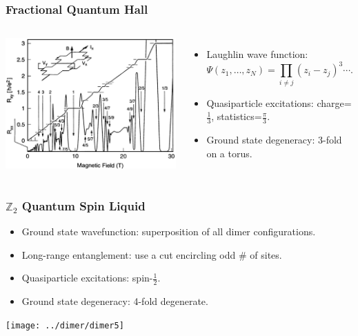 \documentclass[xcolor=table, 10pt, aspectratio=43]{beamer}
\begin{document}
\begin{frame}
\frametitle{Fractional Quantum Hall}
\begin{columns}
  \begin{center}
  \includegraphics[width=\columnwidth]{../resources/fqhe}
  \end{center}
  \begin{itemize}
  \item Laughlin wave function:
  \[\Psi(z_1,\ldots,z_N)=\prod_{i\neq j}(z_i-z_j)^3\cdots.\]
  \item Quasiparticle excitations: charge=$\frac13$, statistics=$\frac\pi3$.
  \item Ground state degeneracy: 3-fold on a torus.
  \end{itemize}
\end{columns}
\end{frame}

\begin{frame}
\frametitle{$\mathbb Z_2$ Quantum Spin Liquid}
\begin{itemize}
\item Ground state wavefunction: superposition of all dimer configurations.
\item Long-range entanglement: use a cut encircling odd \# of sites.
\item Quasiparticle excitations: spin-$\frac12$.
\item Ground state degeneracy: 4-fold degenerate.
\end{itemize}
\begin{center}
\texttt{[image: ../dimer/dimer5]}
\end{center}
\end{frame}
\end{document}
